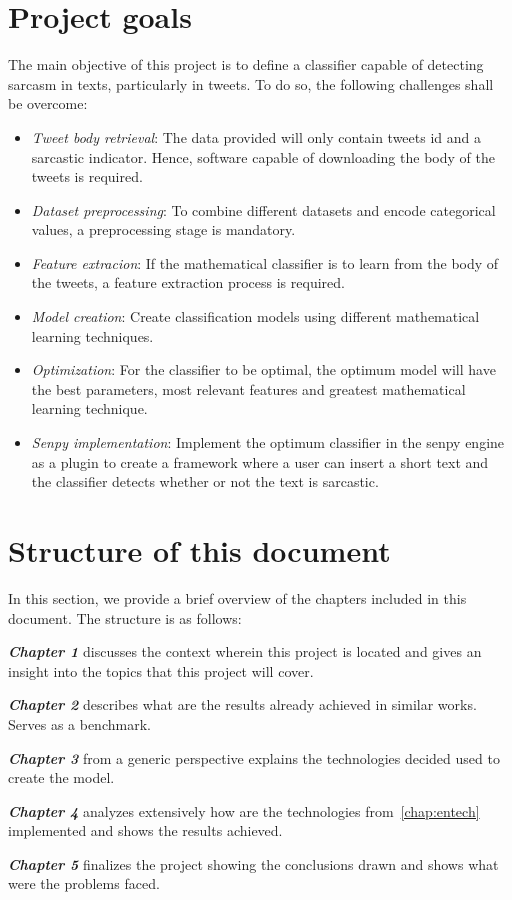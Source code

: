 \section{Project goals}
The main objective of this project is to define a classifier capable of detecting sarcasm in texts, particularly in tweets. To do so, the following challenges shall be overcome:

\begin{itemize}

\item  \textit{Tweet body retrieval}: The data provided will only contain tweets id and a sarcastic indicator. Hence, software capable of downloading the body of the tweets is required.
\item \textit{Dataset preprocessing}: To combine different datasets and encode categorical values, a preprocessing stage is mandatory.
\item \textit{Feature extracion}: If the mathematical classifier is to learn from the body of the tweets, a feature extraction process is required.
\item \textit{Model creation}: Create classification models using different mathematical learning techniques.
\item \textit{Optimization}: For the classifier to be optimal, the optimum model will have the best parameters, most relevant features and greatest mathematical learning technique.
\item \textit{Senpy implementation}: Implement the optimum classifier in the senpy engine as a plugin to create a framework where a user can insert a short text and the classifier detects whether or not the text is sarcastic.

\end{itemize}

\section{Structure of this document}
In this section, we provide a brief overview of the chapters included in this document. The structure is as follows:

\textbf{\textit{Chapter 1}} discusses the context wherein this project is located and gives an insight into the topics that this project will cover.

\textbf{\textit{Chapter 2}} describes what are the results already achieved in similar works. Serves as a benchmark.

\textbf{\textit{Chapter 3}} from a generic perspective explains the technologies decided used to create the model.

\textbf{\textit{Chapter 4}} analyzes extensively how are the technologies from~\cref{chap:entech} implemented and shows the results achieved.

\textbf{\textit{Chapter 5}} finalizes the project showing the conclusions drawn and shows what were the problems faced.
